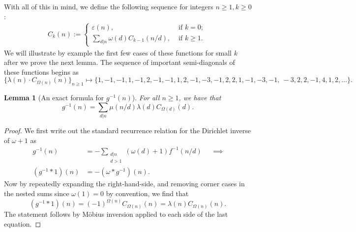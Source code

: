 \documentclass[11pt,reqno,a4letter]{article}
\numberwithin{figure}{section}
\numberwithin{table}{section}
\newcommand{\seqnum}[1]{\href{http://oeis.org/#1}{\color{ProcessBlue}{\underline{#1}}}}
\theoremstyle{plain}
\newtheorem{lemma}[theorem]{Lemma}
\numberwithin{theorem}{section}
\theoremstyle{definition}
\begin{document}
With all of this in mind, we define the following sequence for integers $n \geq 1, k \geq 0$: 
\begin{align} 
C_k(n) := \begin{cases} 
     \varepsilon(n), & \text{ if $k = 0$; } \\ 
     \sum\limits_{d|n} \omega(d) C_{k-1}(n/d), & \text{ if $k \geq 1$. } 
     \end{cases} 
\end{align} 
We will illustrate by example the first few cases of these functions for small $k$ after we prove 
the next lemma. 
The sequence of important semi-diagonals of these functions begins as 
\cite[\seqnum{A008480}]{OEIS} 
\[
\{\lambda(n) \cdot C_{\Omega(n)}(n) \}_{n \geq 1} \mapsto \{
     1, -1, -1, 1, -1, 2, -1, -1, 1, 2, -1, -3, -1, 2, 2, 1, -1, -3, -1, \
     -3, 2, 2, -1, 4, 1, 2, \ldots \}. 
\]

\begin{lemma}[An exact formula for $g^{-1}(n)$] 
\label{lemma_AnExactFormulaFor_gInvByMobiusInv_v1} 
For all $n \geq 1$, we have that 
\[
g^{-1}(n) = \sum_{d|n} \mu(n/d) \lambda(d) C_{\Omega(d)}(d). 
\]
\end{lemma}
\begin{proof} 
We first write out the standard recurrence relation for the Dirichlet inverse of 
$\omega+1$ as 
\begin{align*} 
g^{-1}(n) & = - \sum_{\substack{d|n \\ d>1}} (\omega(d) + 1) f^{-1}(n/d) && \implies \\ 
     (g^{-1} \ast 1)(n) & = -(\omega \ast g^{-1})(n). 
\end{align*} 
Now by repeatedly expanding the right-hand-side, and removing corner cases in the nested sums since 
$\omega(1) = 0$ by convention, we find that 
\[
(g^{-1} \ast 1)(n) = (-1)^{\Omega(n)} C_{\Omega(n)}(n) = \lambda(n) C_{\Omega(n)}(n). 
\]
The statement follows by M\"obius inversion applied to each side of the last equation. 
\end{proof}
\end{document}
